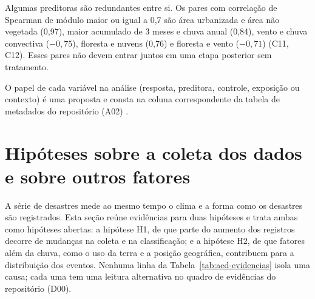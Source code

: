 Algumas preditoras são redundantes entre si. Os pares com correlação de Spearman de módulo maior ou igual a 0,7 são área urbanizada e área não vegetada (0,97), maior acumulado de 3 meses e chuva anual (0,84), vento e chuva convectiva ($-0{,}75$), floresta e nuvens (0,76) e floresta e vento ($-0{,}71$) (C11, C12). Esses pares não devem entrar juntos em uma etapa posterior sem tratamento.

O papel de cada variável na análise (resposta, preditora, controle, exposição ou contexto) é uma proposta e consta na coluna correspondente da tabela de metadados do repositório (A02) .

\section{Hipóteses sobre a coleta dos dados e sobre outros fatores}
\label{sec:aed-hipoteses}

A série de desastres mede ao mesmo tempo o clima e a forma como os desastres são registrados. Esta seção reúne evidências para duas hipóteses e trata ambas como hipóteses abertas: a hipótese H1, de que parte do aumento dos registros decorre de mudanças na coleta e na classificação; e a hipótese H2, de que fatores além da chuva, como o uso da terra e a posição geográfica, contribuem para a distribuição dos eventos. Nenhuma linha da Tabela~\ref{tab:aed-evidencias} isola uma causa; cada uma tem uma leitura alternativa no quadro de evidências do repositório (D00).

